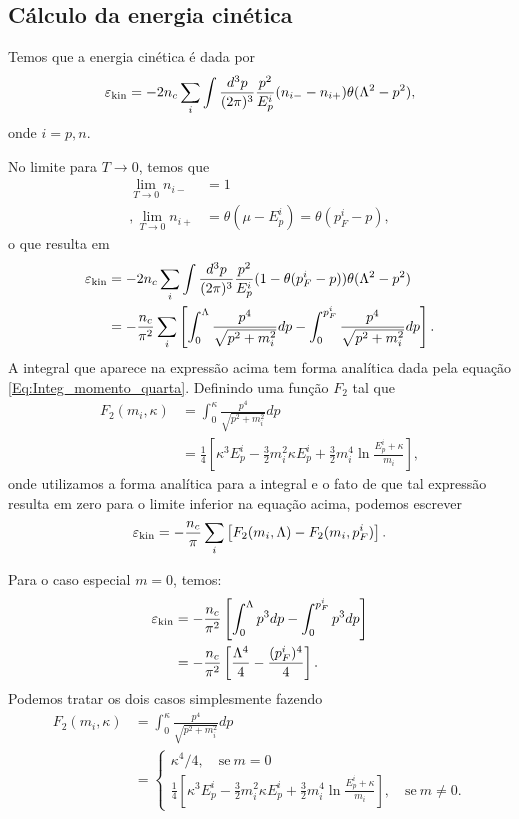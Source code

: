 \subsection{Cálculo da energia cinética}

Temos que a energia cinética é dada por
\begin{equation}
	\varepsilon_{\rm{kin}} = - 2 n_c \sum_i \int \frac{d^3p}{(2\pi)^3} \frac{p^2}{E_p^i} (n_{i-} - n_{i+}) \theta(\Lambda^2 - p^2),
\end{equation}
%
onde $i = p, n$.

No limite para $T \to 0$, temos que
\begin{align}
	\lim_{T \to 0} n_{i-} &= 1 \\,
	\lim_{T \to 0} n_{i+} &= \theta(\mu - E_p^i) = \theta(p_F^i - p),
\end{align}
%
o que resulta em
\begin{align}
	\varepsilon_{\rm{kin}} &= - 2 n_c \sum_i \int \frac{d^3p}{(2\pi)^3} \frac{p^2}{E_p^i} (1 - \theta(p_F^i - p))\theta(\Lambda^2 - p^2) \\
	&= -  \frac{n_c}{\pi^2} \sum_i \left[\int_0^\Lambda \frac{p^4}{\sqrt{p^2 + m_i^2}} dp - \int_0^{p_F^i} \frac{p^4}{\sqrt{p^2 + m_i^2}} dp\right].
\end{align}
%
A integral que aparece na expressão acima tem forma analítica dada pela equação \ref{Eq:Integ_momento_quarta}. Definindo uma função $F_2$ tal que
\begin{align}
	F_2(m_i, \kappa) &= \int_0^\kappa \frac{p^4}{\sqrt{p^2 + m_i^2}} dp \\
	&= \frac{1}{4}\left[\kappa^3 E_p^i - \frac{3}{2} m_i^2\kappa E_p^i + \frac{3}{2}m_i^4\ln \frac{E_p^i + \kappa}{m_i}\right],
\end{align}
%
onde utilizamos a forma analítica para a integral e o fato de que tal expressão resulta em zero para o limite inferior na equação acima, podemos escrever
\begin{equation}
	\varepsilon_{\rm{kin}} = - \frac{n_c}{\pi} \sum_i \left[F_2(m_i, \Lambda) - F_2(m_i, p_F^i)\right].
\end{equation}

Para o caso especial $m = 0$, temos:
\begin{align}
	\varepsilon_{\rm{kin}} &= - \frac{n_c}{\pi^2}\left[\int_0^\Lambda p^3 dp - \int_0^{p_F^i} p^3 dp\right] \\
	&= - \frac{n_c}{\pi^2}\left[\frac{\Lambda^4}{4} - \frac{(p_F^i)^4}{4}\right].
\end{align}
%
Podemos tratar os dois casos simplesmente fazendo
\begin{align}
	F_2(m_i, \kappa) &= \int_0^\kappa \frac{p^4}{\sqrt{p^2 + m_i^2}} dp \\
	&= \begin{cases} \kappa^4/4, \quad \textrm{se}~ m = 0 \\ \frac{1}{4}\left[\kappa^3 E_p^i - \frac{3}{2} m_i^2\kappa E_p^i + \frac{3}{2}m_i^4\ln \frac{E_p^i + \kappa}{m_i}\right], \quad \textrm{se}~ m\neq 0. \end{cases}
\end{align}

